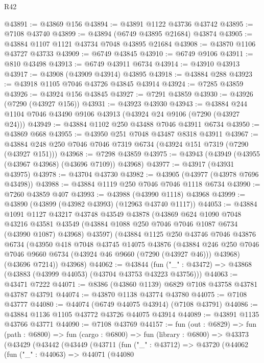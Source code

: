 \begin{lexlean}{R42}
\begin{coremodule}
{@43891 := @43869 @156
@43894 := @43891 @1122 @43736 @43742
@43895 := @7108 @43740
@43899 := @43894 (@6749 @43895 @21684) @43874
@43905 := @43884 @1107 @1121 @43734 @7048 @43895 @21684
@43908 := @43870 @1106 @43727 @43733
@43909 := @6749 @43845
@43910 := @6749 @9106
@43911 := @810 @43498
@43913 := @6749 @43911 @6734
@43914 := @43910 @43913
@43917 := @43908 (@43909 @43914) @43895
@43918 := @43884 @288
@43923 := @43918 @1105 @7046 @43726 @43845 @43914
@43924 := @7285 @43859
@43926 := @43924 @156 @43845
@43927 := @7291 @43859
@43930 := @43926 (@7290 (@43927 @156))
@43931 := @43923 @43930
@43943 := @43884 @244 @1104 @7046 @43490 @9106 @43913 (@43924 @24 @9106 (@7290 (@43927 @24)))
@43949 := @43884 @1102 @250 @43488 @7046 @43911 @6734
@43950 := @43869 @668
@43955 := @43950 @251 @7048 @43487 @8318 @43911
@43967 := @43884 @248 @250 @7046 @7046 @7319 @6734 (@43924 @151 @7319 (@7290 (@43927 @151)))
@43968 := @7298 @43859
@43975 := @43943 (@43949 (@43955 (@43967 @43968) (@43696 @7109)) @43968)
@43977 := @43917 (@43931 @43975)
@43978 := @43704 @43730
@43982 := @43905 (@43977 (@43978 @7696 @43498))
@43988 := @43884 @1119 @250 @7046 @7046 @1118 @6734
@43990 := @7260 @43859 @407
@43993 := @43988 (@43990 @1118) @43968
@43999 := @43890 (@43899 (@43982 @43993) (@12963 @43740 @1117))
@44053 := @43884
    @1091
    @1127
    @43217
    @43748
    @43549
    @43878
    (@43869
      @624
      @1090
      @7048
      @43216
      @43581
      @43549
      (@43884 @1088 @250 @7046 @7046 @1087 @6734 (@43990 @1087) @43968)
      @43597)
    (@43884
      @1125
      @250
      @43746
      @7046
      @43876
      @6734
      (@43950
        @418
        @7048
        @43745
        @14075
        @43876
        (@43884 @246 @250 @7046 @7046 @9660 @6734 (@43924 @46 @9660 (@7290 (@43927 @46))) @43968)
        (@43696 @7214))
      @43968)
@44062 := @43844
    (fun ("_" : @43472) => @43868 (@43883 (@43999 @44053) (@43704 @43753 @43223 @43756)))
@44063 := @43471 @7222
@44071 := @8386 (@43860 @1139) @6829 @7108 @43758 @43781 @43787 @43791
@44074 := @43870 @1138 @43774 @43780
@44075 := @7108 @43777
@44080 := @44074 (@6749 @44075 @43914) (@7108 @43791)
@44086 := @43884 @1136 @1105 @43772 @43726 @44075 @43914
@44089 := @43891 @1135 @43766 @43771
@44090 := @7108 @43769
@44157 := fun (out : @6829) =>
  fun (path : @6800) =>
  fun (cargo : @6800) =>
  fun (library : @6800) =>
  @43373
    (@43429
      (@43442
        (@43449
          (@43711
            (fun ("_" : @43712) =>
            @43720
              (@44062
                (fun ("_" : @44063) =>
                @44071
                  (@44080
}
\end{coremodule}
\end{lexlean}
